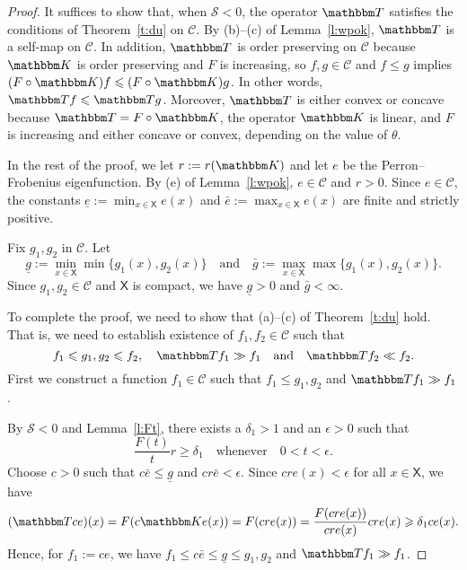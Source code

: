 \documentclass[12pt, reqno]{amsart}
\renewcommand{\leq}{\leqslant}
\renewcommand{\geq}{\geqslant}
\newcommand{\1}{\mathbbm 1}
\newcommand{\cC}{\mathscr C}
\newcommand{\sS}{\mathscr S}
\newcommand{\KK}{\mathbbm K}
\newcommand{\TT}{\mathbbm T}
\newcommand{\XX}{\mathsf X}
\theoremstyle{plain}
\theoremstyle{definition}
\begin{document}
\begin{proof}
    It suffices to show that, when $\sS < 0$, the operator $\TT$ satisfies 
    the conditions of Theorem~\ref{t:du} on $\cC$.  
    By (b)--(c) of Lemma~\ref{l:wpok}, $\TT$ is a self-map on $\cC$.
    In addition,
    $\TT$ is order preserving on $\cC$ because $\KK$ is order preserving and $F$
    is increasing, so $f, g \in \cC$ and $f \leq g$ implies $(F \circ \KK) f \leq
    (F \circ \KK) g$.  In other words, $\TT f \leq \TT g$.  Moreover, $\TT $ is either
    convex or concave because $\TT  = F \circ \KK$, the operator $\KK$ is linear,
    and $F$ is increasing and either concave or convex,
    depending on the value of $\theta$. 

    In the rest of the proof, we let
    $r := r(\KK)$ and let $e$ be the Perron--Frobenius eigenfunction.
    By (e) of Lemma~\ref{l:wpok}, $e \in \cC$ and $r > 0$.
    Since $e \in \cC$, the constants $\underline e := \min_{x
    \in \XX} e(x)$ and $\bar e := \max_{x \in \XX} e(x)$ are finite and strictly
    positive.  

    Fix $g_1, g_2$ in $\cC$. Let
    \begin{equation*}
        \underline g := \min_{x \in \XX} \min\{g_1(x), g_2(x)\}
        \quad \text{and} \quad
        \bar g := \max_{x \in \XX} \max\{g_1(x), g_2(x)\}.
    \end{equation*}
    Since $g_1, g_2 \in \cC$ and $\XX$ is compact, we have $\underline g > 0$
    and $\bar g < \infty$.

    To complete the proof, we need to show that
    (a)--(c) of Theorem~\ref{t:du} hold.  That is, we need to establish existence of
    $f_1, f_2 \in \cC$ such that 
    \begin{equation*}
        f_1 \leq g_1, g_2 \leq f_2,
        \quad
        \TT f_1 \gg f_1
        \quad \text{and} \quad
        \TT f_2 \ll f_2.
    \end{equation*}
    First we construct a function $f_1 \in \cC$ such that 
    $f_1 \leq g_1, g_2$ and  $\TT f_1 \gg f_1$.

    By $\sS < 0$ and Lemma~\ref{l:Ft}, there exists
    a $\delta_1 > 1$ and an $\epsilon > 0$ such that
    \begin{equation}
        \frac{F(t)}{t} r \geq \delta_1
        \quad \text{whenever} \quad 0 < t < \epsilon.
    \end{equation}
    Choose $c > 0$ such that $c \bar e \leq \underline g$ and $c r \bar e <
    \epsilon$.  Since  $c r e(x) < \epsilon$ for all $x \in \XX$, we have
    \begin{equation}
        (\TT  ce)(x)
        = F(c \KK e (x))
        = F(c r e (x))
        = \frac{ F(c r e (x)) }{c r e (x)} c r e (x)
        \geq \delta_1 c e (x).
    \end{equation}
    Hence, for $f_1 := c e$, we have $f_1 \leq c \bar e \leq \underline g \leq
    g_1, g_2$ and $\TT  f_1 \gg f_1$.


\end{proof}
\end{document}
